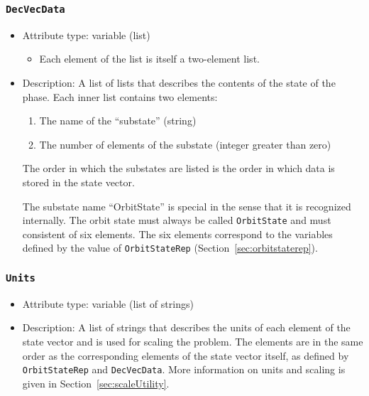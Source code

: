 \documentclass[]{article}
\begin{document}
\subsubsection{\texttt{DecVecData}}

\begin{itemize}
	\item Attribute type: variable (list)
	\begin{itemize}
		\item Each element of the list is itself a two-element list.
	\end{itemize}
	\item Description: A list of lists that describes the contents of the state of the phase. Each inner list contains two elements: 
	\begin{enumerate}
		\item The name of the ``substate'' (string)
		\item The number of elements of the substate (integer greater than zero)
	\end{enumerate}
	The order in which the substates are listed is the order in which data is stored in the state vector. 
	
	The substate name ``OrbitState'' is special in the sense that it is recognized internally. The orbit state must always be called \texttt{OrbitState} and must consistent of six elements. The six elements correspond to the variables defined by the value of \texttt{OrbitStateRep} (Section~\ref{sec:orbitstaterep}).
\end{itemize}

\subsubsection{\texttt{Units}}

\begin{itemize}
	\item Attribute type: variable (list of strings)
	\item Description: A list of strings that describes the units of each element of the state vector and is used for scaling the problem. The elements are in the same order as the corresponding elements of the state vector itself, as defined by \texttt{OrbitStateRep} and \texttt{DecVecData}. More information on units and scaling is given in Section~\ref{sec:scaleUtility}.
\end{itemize}
\end{document}
